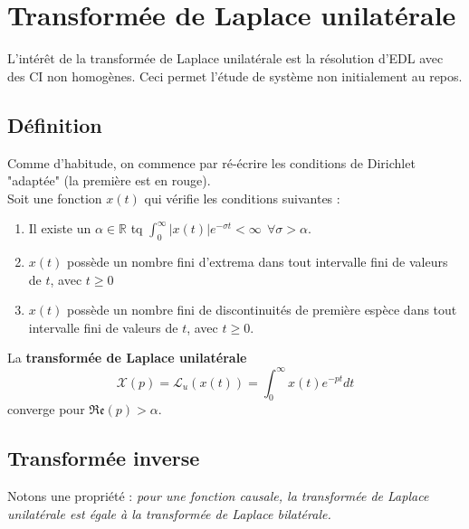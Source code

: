 	
	
\section{Transformée de Laplace unilatérale}
L'intérêt de la transformée de Laplace unilatérale est la résolution d'EDL avec des CI non homogènes.
Ceci permet l'étude de système non initialement au repos.
	
	\subsection{Définition}
	Comme d'habitude, on commence par ré-écrire les conditions de Dirichlet "adaptée" (la première
	est en rouge).\\
	Soit une fonction $x(t)$ qui vérifie les conditions suivantes :
	\begin{enumerate}
	\item Il existe un $\alpha \in \mathbb{R}$ tq $\int_0^\infty |x(t)|e^{-\sigma t} < \infty\ \ 
	\forall \sigma > \alpha$.
	\item $x(t)$ possède un nombre fini d'extrema dans tout intervalle fini de valeurs de $t$, avec
	$t\geq 0$
	\item $x(t)$ possède un nombre fini de discontinuités de première espèce dans tout intervalle
	fini de valeurs de $t$, avec $t\geq 0$.
	\end{enumerate}
	La \textbf{transformée de Laplace unilatérale}
	\begin{equation}
	\mathcal{X}(p) = \mathcal{L}_u(x(t)) = \int_0^\infty x(t)e^{-pt}dt
	\end{equation}
	converge pour $\mathfrak{Re}(p)>\alpha$.
	
	\subsection{Transformée inverse}
	
	Notons une propriété : \textit{pour une fonction causale, la transformée de Laplace unilatérale  
	est	égale à la transformée de Laplace bilatérale.}
	
